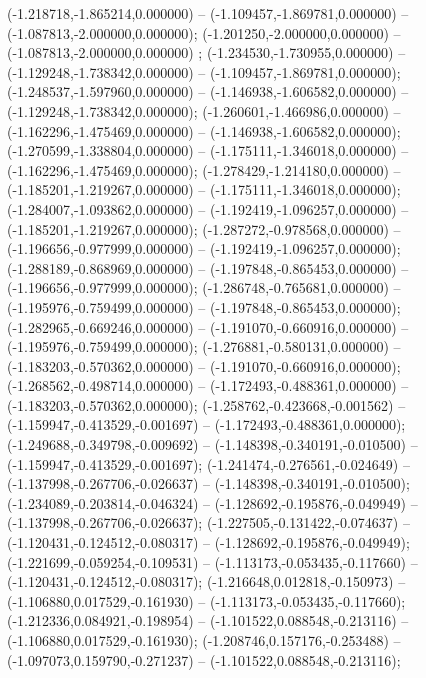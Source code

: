  (-1.218718,-1.865214,0.000000) -- (-1.109457,-1.869781,0.000000) -- (-1.087813,-2.000000,0.000000);
 (-1.201250,-2.000000,0.000000) -- (-1.087813,-2.000000,0.000000) ;
 (-1.234530,-1.730955,0.000000) -- (-1.129248,-1.738342,0.000000) -- (-1.109457,-1.869781,0.000000);
 (-1.248537,-1.597960,0.000000) -- (-1.146938,-1.606582,0.000000) -- (-1.129248,-1.738342,0.000000);
 (-1.260601,-1.466986,0.000000) -- (-1.162296,-1.475469,0.000000) -- (-1.146938,-1.606582,0.000000);
 (-1.270599,-1.338804,0.000000) -- (-1.175111,-1.346018,0.000000) -- (-1.162296,-1.475469,0.000000);
 (-1.278429,-1.214180,0.000000) -- (-1.185201,-1.219267,0.000000) -- (-1.175111,-1.346018,0.000000);
 (-1.284007,-1.093862,0.000000) -- (-1.192419,-1.096257,0.000000) -- (-1.185201,-1.219267,0.000000);
 (-1.287272,-0.978568,0.000000) -- (-1.196656,-0.977999,0.000000) -- (-1.192419,-1.096257,0.000000);
 (-1.288189,-0.868969,0.000000) -- (-1.197848,-0.865453,0.000000) -- (-1.196656,-0.977999,0.000000);
 (-1.286748,-0.765681,0.000000) -- (-1.195976,-0.759499,0.000000) -- (-1.197848,-0.865453,0.000000);
 (-1.282965,-0.669246,0.000000) -- (-1.191070,-0.660916,0.000000) -- (-1.195976,-0.759499,0.000000);
 (-1.276881,-0.580131,0.000000) -- (-1.183203,-0.570362,0.000000) -- (-1.191070,-0.660916,0.000000);
 (-1.268562,-0.498714,0.000000) -- (-1.172493,-0.488361,0.000000) -- (-1.183203,-0.570362,0.000000);
 (-1.258762,-0.423668,-0.001562) -- (-1.159947,-0.413529,-0.001697) -- (-1.172493,-0.488361,0.000000);
 (-1.249688,-0.349798,-0.009692) -- (-1.148398,-0.340191,-0.010500) -- (-1.159947,-0.413529,-0.001697);
 (-1.241474,-0.276561,-0.024649) -- (-1.137998,-0.267706,-0.026637) -- (-1.148398,-0.340191,-0.010500);
 (-1.234089,-0.203814,-0.046324) -- (-1.128692,-0.195876,-0.049949) -- (-1.137998,-0.267706,-0.026637);
 (-1.227505,-0.131422,-0.074637) -- (-1.120431,-0.124512,-0.080317) -- (-1.128692,-0.195876,-0.049949);
 (-1.221699,-0.059254,-0.109531) -- (-1.113173,-0.053435,-0.117660) -- (-1.120431,-0.124512,-0.080317);
 (-1.216648,0.012818,-0.150973) -- (-1.106880,0.017529,-0.161930) -- (-1.113173,-0.053435,-0.117660);
 (-1.212336,0.084921,-0.198954) -- (-1.101522,0.088548,-0.213116) -- (-1.106880,0.017529,-0.161930);
 (-1.208746,0.157176,-0.253488) -- (-1.097073,0.159790,-0.271237) -- (-1.101522,0.088548,-0.213116);
